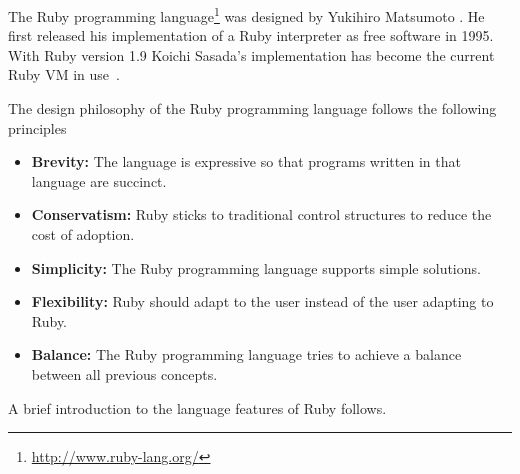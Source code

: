 \documentclass[12pt,a4paper,oneside,openright]{book}
\begin{document}
\begin{CJK}{UTF8}{}
The Ruby programming language\footnote{\url{http://www.ruby-lang.org/}} was designed by Yukihiro Matsumoto \citetext{see article by \citealp{informit} for a short introduction to Ruby; see \citealp{RefWorks:541}, \citealp{RefWorks:580}, or \citealp{cooper2009beginning} for a thorough introduction}. He first released his implementation of a Ruby interpreter as free software in 1995. With Ruby version 1.9 Koichi Sasada's implementation has become the current Ruby \ac{VM} in use~\citep{ko2008}.

The design philosophy of the Ruby programming language follows the following principles~\citep{MatsumotoCode}
\begin{itemize}
\item \textbf{Brevity:} The language is expressive so that programs written in that language are succinct.
\item \textbf{Conservatism:} Ruby sticks to traditional control structures to reduce the cost of adoption.
\item \textbf{Simplicity:} The Ruby programming language supports simple solutions.
\item \textbf{Flexibility:} Ruby should adapt to the user instead of the user adapting to Ruby.
\item \textbf{Balance:} The Ruby programming language tries to achieve a balance between all previous concepts.
\end{itemize}

A brief introduction to the language features of Ruby follows.


\end{CJK}
\end{document}
